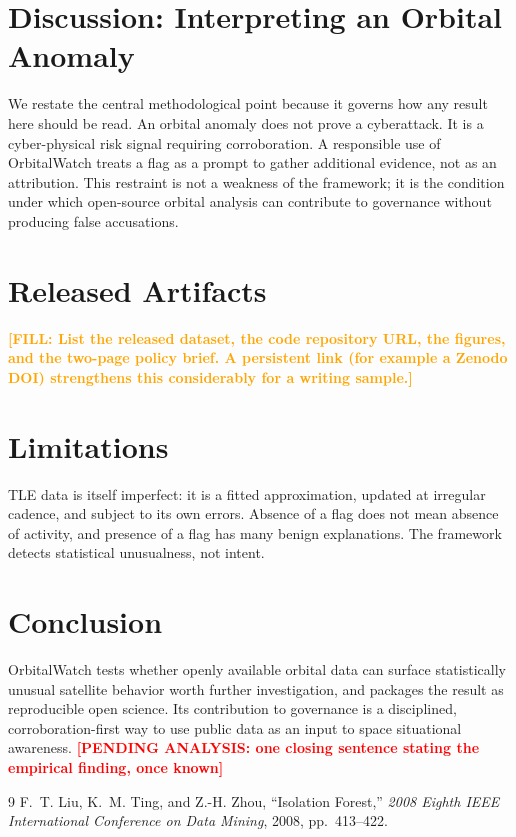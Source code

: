 \documentclass[11pt]{article}
\newcommand{\pending}[1]{\textcolor{red}{\textbf{[PENDING ANALYSIS: #1]}}}
\newcommand{\fill}[1]{\textcolor{orange}{\textbf{[FILL: #1]}}}
\begin{document}
\section{Discussion: Interpreting an Orbital Anomaly}

We restate the central methodological point because it governs how any result
here should be read. An orbital anomaly does not prove a cyberattack. It is a
cyber-physical risk signal requiring corroboration. A responsible use of
OrbitalWatch treats a flag as a prompt to gather additional evidence, not as an
attribution. This restraint is not a weakness of the framework; it is the
condition under which open-source orbital analysis can contribute to governance
without producing false accusations.

\section{Released Artifacts}
\label{sec:artifacts}
\fill{List the released dataset, the code repository URL, the figures, and the
two-page policy brief. A persistent link (for example a Zenodo DOI) strengthens
this considerably for a writing sample.}

\section{Limitations}
TLE data is itself imperfect: it is a fitted approximation, updated at irregular
cadence, and subject to its own errors. Absence of a flag does not mean absence
of activity, and presence of a flag has many benign explanations. The framework
detects statistical unusualness, not intent.

\section{Conclusion}
OrbitalWatch tests whether openly available orbital data can surface
statistically unusual satellite behavior worth further investigation, and
packages the result as reproducible open science. Its contribution to governance
is a disciplined, corroboration-first way to use public data as an input to
space situational awareness. \pending{one closing sentence stating the empirical
finding, once known}

\begin{thebibliography}{9}
F.~T. Liu, K.~M. Ting, and Z.-H. Zhou,
``Isolation Forest,''
\emph{2008 Eighth IEEE International Conference on Data Mining}, 2008, pp.\ 413--422.
\end{thebibliography}
\end{document}
